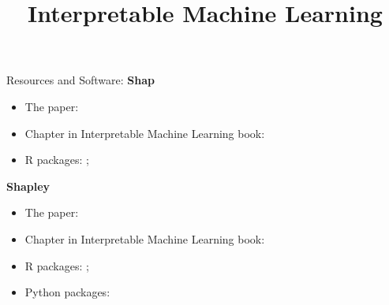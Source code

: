 \documentclass[10pt,compress,t,notes=noshow, xcolor=table]{beamer}
\title{Interpretable Machine Learning}
\date{}
\begin{document}


\begin{frame}{Resources and Software:}
\textbf{Shap}
\begin{itemize}
    \item The paper: 
    \item Chapter in Interpretable Machine Learning book: 
    \item R packages: ; 
\end{itemize}

\medskip

\textbf{Shapley}
\begin{itemize}
    \item The paper: 
    \item Chapter in Interpretable Machine Learning book: 
    \item R packages: ; 
    \item Python packages: 
\end{itemize}
\end{frame}


\endlecture
\end{document}
